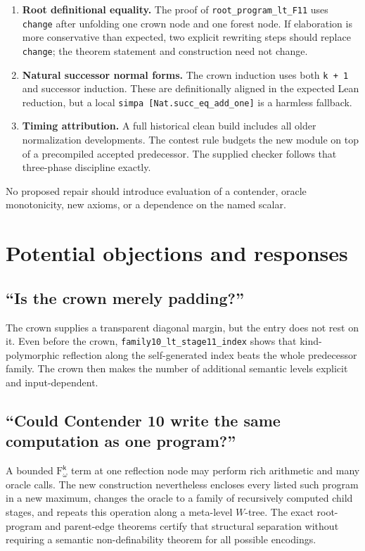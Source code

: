 \documentclass[11pt]{article}
\theoremstyle{definition}
\theoremstyle{remark}
\newcommand{\Fk}{\mathrm{F}_{\omega}^{\mathsf{k}}}
\newcommand{\code}[1]{\texttt{#1}}
\begin{document}
\begin{enumerate}
\item \textbf{Root definitional equality.}  The proof of
\code{root\_program\_lt\_F11} uses \code{change} after unfolding one crown node
and one forest node.  If elaboration is more conservative than expected, two
explicit rewriting steps should replace \code{change}; the theorem statement
and construction need not change.
\item \textbf{Natural successor normal forms.}  The crown induction uses both
\code{k + 1} and successor induction.  These are definitionally aligned in the
expected Lean reduction, but a local \code{simpa [Nat.succ\_eq\_add\_one]} is a
harmless fallback.
\item \textbf{Timing attribution.}  A full historical clean build includes all
older normalization developments.  The contest rule budgets the new module on
top of a precompiled accepted predecessor.  The supplied checker follows that
three-phase discipline exactly.
\end{enumerate}

No proposed repair should introduce evaluation of a contender, oracle
monotonicity, new axioms, or a dependence on the named scalar.

\section{Potential objections and responses}

\subsection{``Is the crown merely padding?''}

The crown supplies a transparent diagonal margin, but the entry does not rest
on it.  Even before the crown, \code{family10\_lt\_stage11\_index} shows that
kind-polymorphic reflection along the self-generated index beats the whole
predecessor family.  The crown then makes the number of additional semantic
levels explicit and input-dependent.

\subsection{``Could Contender 10 write the same computation as one program?''}

A bounded $\Fk$ term at one reflection node may perform rich arithmetic and
many oracle calls.  The new construction nevertheless encloses every listed
such program in a new maximum, changes the oracle to a family of recursively
computed child stages, and repeats this operation along a meta-level $W$-tree.
The exact root-program and parent-edge theorems certify that structural
separation without requiring a semantic non-definability theorem for all
possible encodings.
\end{document}
